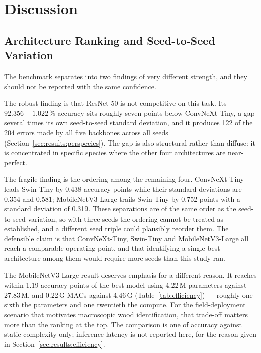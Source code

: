 %
%

\section{Discussion}
\label{sec:discussion}

\subsection{Architecture Ranking and Seed-to-Seed Variation}
\label{sec:discussion:ranking}

The benchmark separates into two findings of very different strength, and
they should not be reported with the same confidence.

The robust finding is that ResNet-50 is not competitive on this task. Its
$92.356 \pm 1.022$\,\% accuracy sits roughly seven points below
ConvNeXt-Tiny, a gap several times its own seed-to-seed standard deviation,
and it produces 122 of the 204 errors made by all five backbones across all
seeds (Section~\ref{sec:results:perspecies}). The gap is also structural
rather than diffuse: it is concentrated in specific species where the other
four architectures are near-perfect.

The fragile finding is the ordering among the remaining four. ConvNeXt-Tiny
leads Swin-Tiny by 0.438 accuracy points while their standard deviations are
0.354 and 0.581; MobileNetV3-Large trails Swin-Tiny by 0.752 points with a
standard deviation of 0.319. These separations are of the same order as the
seed-to-seed variation, so with three seeds the ordering cannot be treated
as established, and a different seed triple could plausibly reorder them.
The defensible claim is that ConvNeXt-Tiny, Swin-Tiny and MobileNetV3-Large
all reach a comparable operating point, and that identifying a single best
architecture among them would require more seeds than this study ran.

The MobileNetV3-Large result deserves emphasis for a different reason. It
reaches within 1.19 accuracy points of the best model using 4.22\,M
parameters against 27.83\,M, and 0.22\,G MACs against 4.46\,G
(Table~\ref{tab:efficiency}) --- roughly one sixth the parameters and one
twentieth the compute. For the field-deployment scenario that motivates
macroscopic wood identification, that trade-off matters more than the
ranking at the top. The comparison is one of accuracy against static
complexity only; inference latency is not reported here, for the reason
given in Section~\ref{sec:results:efficiency}.

